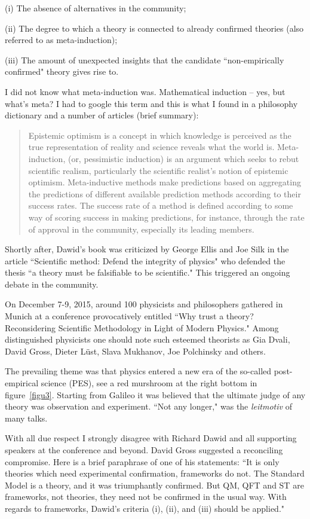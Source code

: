 \documentclass[epsfig,12pt]{article}
\begin{document}
(i) The absence of alternatives in the community;

(ii) The degree to which a theory is connected to already confirmed theories (also referred to as meta-induction);

(iii) The amount of unexpected insights that the candidate ``non-empirically confirmed" theory gives rise to. 

I did not know what meta-induction was. Mathematical induction -- yes, but what's meta? I had to google this term and this is what I found in a philosophy dictionary and a number of articles (brief summary):
\begin{quote}
Epistemic optimism is a concept in which 
knowledge is perceived as the true representation of reality and science reveals what the world is. 
Meta-induction, (or, pessimistic induction) is an argument which seeks to rebut 
scientific realism, particularly the scientific realist's notion of epistemic optimism. Meta-inductive methods make predictions based on aggregating the predictions of different available prediction methods according to their success rates. The success rate of a method is defined according to some way of scoring success in making predictions, for instance, through the rate of approval in the community, especially its leading members.
\end{quote}


Shortly after, Dawid's book was criticized by George Ellis and Joe Silk in the article ``Scientific method: Defend the integrity of physics" \cite{ES} who defended the thesis 
``a theory must be falsifiable to be scientific." This triggered an ongoing debate in the community.

On December 7-9, 2015,  around 100 physicists and philosophers gathered in Munich at a conference provocatively entitled  ``Why trust a theory? Reconsidering Scientific Methodology in Light of Modern Physics." Among distinguished physicists one should note such esteemed theorists as Gia Dvali, David Gross, Dieter L\"ust, Slava Mukhanov, Joe Polchinsky and others.

The prevailing theme was that physics entered a new era of the so-called post-empirical science (PES), see a red murshroom at the right bottom in 
figure~\ref{figu3}. 
Starting from Galileo it was believed that the ultimate judge of any theory was observation and experiment. ``Not any longer," was the {\em leitmotiv} of many talks. 

With all due respect I strongly disagree with Richard Dawid and all supporting speakers at the conference and beyond. David Gross suggested a reconciling compromise. Here is a brief paraphrase of one of his statements:  ``It is only theories which need experimental confirmation, frameworks do not. The Standard Model is a theory, and it was 
triumphantly confirmed. But QM, QFT and ST are frameworks, not theories, they need not be confirmed in the usual way. With regards to frameworks, Dawid's criteria (i), (ii), and (iii) should be applied." 
\end{document}

